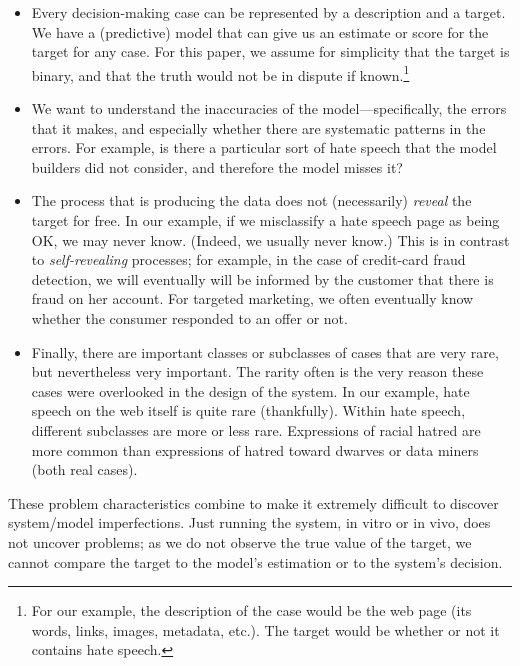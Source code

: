 \begin{itemize}
\itemsep=0.0in
\item Every decision-making case can be represented by a description
  and a target.  We have a (predictive) model that can give us an estimate or
  score for the target for any case.  For this paper, we assume for
  simplicity that the target is binary, and that the truth would not
  be in dispute if known.\footnote{For our example, the
  description of the case would be the web page (its words, links,
  images, metadata, etc.).  The target would be whether or not it
  contains hate speech.}

\item We want to understand the inaccuracies of the
  model---specifically, the errors that it makes, and especially
  whether there are systematic patterns in the errors.  For example,
  is there a particular sort of hate speech that the model builders
  did not consider, and therefore the model misses it?

\item The process that is producing the data does not (necessarily)
  \textit{reveal} the target for free.  In our example, if we
  misclassify a hate speech page as being OK, we may never know.
  (Indeed, we usually never know.)  This is in contrast to
  \textit{self-revealing} processes; for example, in the case of credit-card
  fraud detection, we will eventually will be informed by the customer
  that there is fraud on her account.  For targeted marketing, we
  often eventually know whether the consumer responded to an offer or
  not.

\item Finally, there are important classes or subclasses of cases that
  are very rare, but nevertheless very important.  The rarity often is
  the very reason these cases were overlooked in the design of the
  system.  In our example, hate speech on the web itself is quite
  rare (thankfully).  Within hate speech, different subclasses are
  more or less rare.  Expressions of racial hatred are more common
  than expressions of hatred toward dwarves or data miners (both real cases).

\end{itemize}

These problem characteristics combine to make it extremely difficult to
discover system/model imperfections.  Just running the system, in
vitro or in vivo, does not uncover problems; as we do not observe
the true value of the target, we cannot compare the target to the model's
estimation or to the system's decision.

